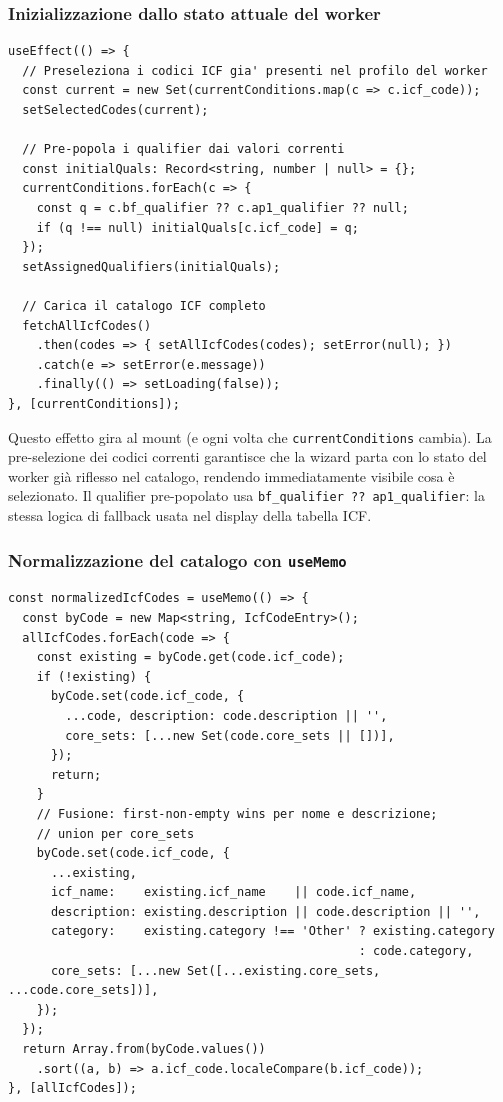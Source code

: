 \documentclass[a4paper,12pt]{article}
\begin{document}
\subsubsection{Inizializzazione dallo stato attuale del worker}
\vspace{2pt}
\begin{lstlisting}
useEffect(() => {
  // Preseleziona i codici ICF gia' presenti nel profilo del worker
  const current = new Set(currentConditions.map(c => c.icf_code));
  setSelectedCodes(current);

  // Pre-popola i qualifier dai valori correnti
  const initialQuals: Record<string, number | null> = {};
  currentConditions.forEach(c => {
    const q = c.bf_qualifier ?? c.ap1_qualifier ?? null;
    if (q !== null) initialQuals[c.icf_code] = q;
  });
  setAssignedQualifiers(initialQuals);

  // Carica il catalogo ICF completo
  fetchAllIcfCodes()
    .then(codes => { setAllIcfCodes(codes); setError(null); })
    .catch(e => setError(e.message))
    .finally(() => setLoading(false));
}, [currentConditions]);
\end{lstlisting}

\noindent Questo effetto gira al mount (e ogni volta che \texttt{currentConditions}
cambia). La pre-selezione dei codici correnti garantisce che la wizard
parta con lo stato del worker gi\`{a} riflesso nel catalogo, rendendo
immediatamente visibile cosa \`{e} selezionato. Il qualifier pre-popolato
usa \texttt{bf\_\allowbreak{}qualifier ?? ap1\_\allowbreak{}qualifier}: la stessa logica di fallback
usata nel display della tabella ICF.

\subsubsection{Normalizzazione del catalogo con \texttt{useMemo}}

\begin{lstlisting}
const normalizedIcfCodes = useMemo(() => {
  const byCode = new Map<string, IcfCodeEntry>();
  allIcfCodes.forEach(code => {
    const existing = byCode.get(code.icf_code);
    if (!existing) {
      byCode.set(code.icf_code, {
        ...code, description: code.description || '',
        core_sets: [...new Set(code.core_sets || [])],
      });
      return;
    }
    // Fusione: first-non-empty wins per nome e descrizione;
    // union per core_sets
    byCode.set(code.icf_code, {
      ...existing,
      icf_name:    existing.icf_name    || code.icf_name,
      description: existing.description || code.description || '',
      category:    existing.category !== 'Other' ? existing.category
                                                 : code.category,
      core_sets: [...new Set([...existing.core_sets, ...code.core_sets])],
    });
  });
  return Array.from(byCode.values())
    .sort((a, b) => a.icf_code.localeCompare(b.icf_code));
}, [allIcfCodes]);
\end{lstlisting}
\end{document}
